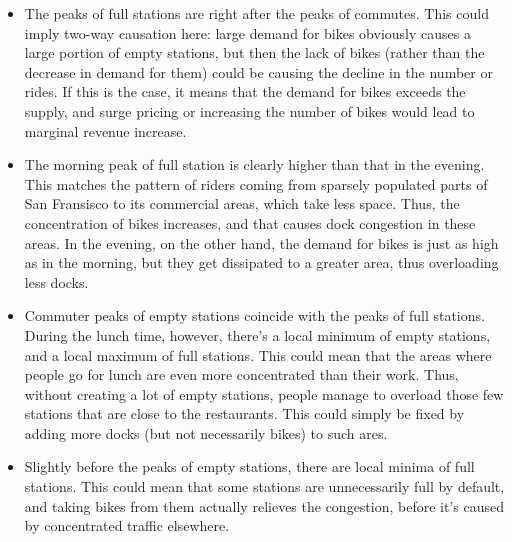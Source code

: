 \documentclass{article}
\begin{document}
\begin{itemize}
	\item
		The peaks of full stations are right after the peaks of commutes. This could imply two-way causation here: large demand for bikes obviously causes a large portion of empty stations, but then the lack of bikes (rather than the decrease in demand for them) could be causing the decline in the number or rides. If this is the case, it means that the demand for bikes exceeds the supply, and surge pricing or increasing the number of bikes would lead to marginal revenue increase.
	\item
		The morning peak of full station is clearly higher than that in the evening. This matches the pattern of riders coming from sparsely populated parts of San Fransisco to its commercial areas, which take less space. Thus, the concentration of bikes increases, and that causes dock congestion in these areas. In the evening, on the other hand, the demand for bikes is just as high as in the morning, but they get dissipated to a greater area, thus overloading less docks.
	\item
		Commuter peaks of empty stations coincide with the peaks of full stations. During the lunch time, however, there's a local minimum of empty stations, and a local maximum of full stations. This could mean that the areas where people go for lunch are even more concentrated than their work. Thus, without creating a lot of empty stations, people manage to overload those few stations that are close to the restaurants. This could simply be fixed by adding more docks (but not necessarily bikes) to such ares.
	\item
		Slightly before the peaks of empty stations, there are local minima of full stations. This could mean that some stations are unnecessarily full by default, and taking bikes from them actually relieves the congestion, before it's caused by concentrated traffic elsewhere.
\end{itemize}
\end{document}
